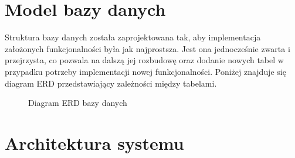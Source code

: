 \section{Model bazy danych}
Struktura bazy danych została zaprojektowana tak, aby implementacja założonych  funkcjonalności była jak najprostsza. Jest ona jednocześnie zwarta i przejrzysta, co pozwala na dalszą jej rozbudowę oraz dodanie nowych tabel w przypadku potrzeby implementacji nowej funkcjonalności. Poniżej znajduje się diagram ERD przedstawiający zależności między tabelami.
\begin{figure}[h!]
	\caption{Diagram ERD bazy danych}
	\centering
\end{figure}


\section{Architektura systemu}

